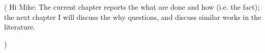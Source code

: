 \documentclass[a4paper]{article}
\begin{document}
(
Hi Mike: 
The current chapter reports the what are done and how (i.e. the fact);
the next chapter I will discuss the why questions, and discuss similar works in the literature.  

)






\end{document}
